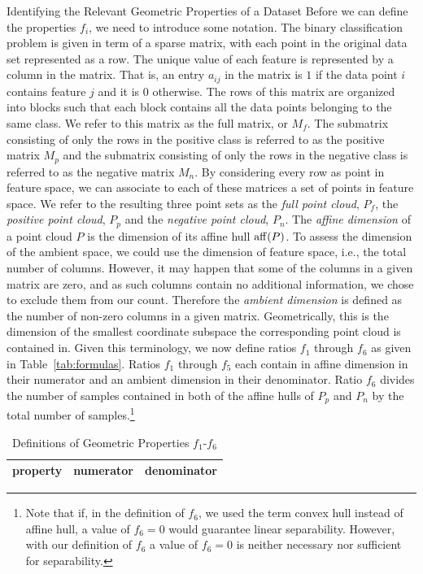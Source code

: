 \documentclass{llncs}
\begin{document}
\begin{section}{Identifying the Relevant Geometric Properties of a Dataset}
Before we can define the properties $f_i$, we need to introduce some notation. The binary classification problem is given in term of a sparse matrix, with each point in the original data set represented as a row. The unique value of each feature is represented by a column in the matrix. That is, an entry $a_{ij}$ in the matrix is $1$ if the data point $i$ contains feature $j$ and it is $0$ otherwise. The rows of this matrix are organized into blocks such that each block contains all the data points belonging to the same class. We refer to this matrix as the full matrix, or $M_f$. The submatrix consisting of only the rows in the positive class is referred to as the positive matrix $M_p$ and the submatrix consisting of only the rows in the negative class is referred to as the negative matrix $M_n$. By considering every row as point in feature space, we can associate to each of these matrices a set of points in feature space.  We refer to the resulting three point sets as the {\em full point cloud}, $P_f$, the {\em positive point cloud}, $P_p$ and the {\em negative point cloud}, $P_n$. The {\em affine dimension} of a point cloud $P$ is the dimension of its affine hull $\operatorname{aff}(P)$. To assess the dimension of the ambient space, we could use the dimension of feature space, i.e., the total number of columns. However, it may happen that some of the columns in a given matrix are zero, and as such columns contain no additional information, we chose to exclude them from our count. Therefore the {\em ambient dimension} is defined as the number of non-zero columns in a given matrix. Geometrically, this is the dimension of the smallest coordinate subspace the corresponding point cloud is contained in. Given this terminology, we now define ratios $f_1$ through $f_6$ as given in Table~\ref{tab:formulas}. Ratios $f_1$ through $f_5$ each contain in affine dimension in their numerator and an ambient dimension in their denominator. Ratio $f_6$ divides the number of samples contained in both of the affine hulls of $P_p$ and $P_n$ by the total number of samples.\footnote{Note that if, in the definition of $f_6$, we used the term convex hull instead of affine hull, a value of $f_6=0$ would guarantee linear separability. However, with our definition of $f_6$ a value of $f_6=0$ is neither necessary nor sufficient for separability.}

\begin{table}[ht]
\centering
\caption{Definitions of Geometric Properties $f_1$-$f_6$}
\begin{tabular}{l l r }
\hline \hline
property&numerator&denominator \\
\hline


\end{tabular}
\end{table}
\end{section}
\end{document}
